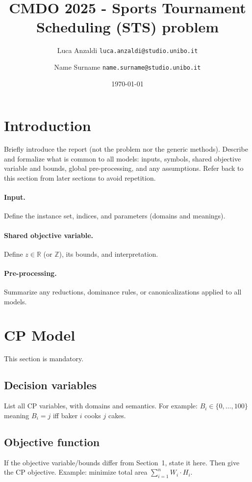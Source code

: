 \documentclass{article}
\title{CMDO 2025 - Sports Tournament Scheduling
(STS) problem}
\author{%
Luca Anzaldi \texttt{luca.anzaldi@studio.unibo.it} \and
Name Surname \texttt{name.surname@studio.unibo.it}
}
\date{\today}
\newcommand{\Z}{\mathbb{Z}}
\newcommand{\R}{\mathbb{R}}
\begin{document}
\maketitle


\section{Introduction}
Briefly introduce the report (not the problem nor the generic methods).
Describe and formalize what is common to all models:
inputs, symbols, shared objective variable and bounds, global pre-processing,
and any assumptions.
Refer back to this section from later sections to avoid repetition.

\paragraph{Input.}
Define the instance set, indices, and parameters (domains and meanings).

\paragraph{Shared objective variable.}
Define $z \in \R$ (or $\Z$), its bounds, and interpretation.

\paragraph{Pre-processing.}
Summarize any reductions, dominance rules, or canonicalizations applied to all models.

\section{CP Model}
This section is mandatory.

\subsection{Decision variables}
List all CP variables, with domains and semantics.
For example: $B_i \in \{0,\dots,100\}$ meaning $B_i = j$ iff baker $i$ cooks $j$ cakes.

\subsection{Objective function}
If the objective variable/bounds differ from Section~1, state it here.
Then give the CP objective. Example: minimize total area
$ \sum_{i=1}^{n} W_i \cdot H_i $.
\end{document}
